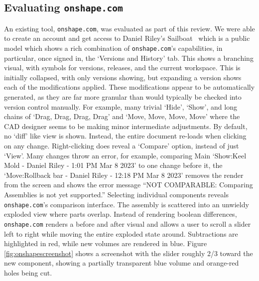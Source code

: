 \documentclass[sigconf,authorversion,nonacm]{acmart}
\begin{document}
\subsection{Evaluating \texttt{onshape.com}}

An existing tool, \texttt{onshape.com}, was evaluated as part of this review.
We were able to create an account and get access to Daniel Riley's Sailboat~\cite{sailboat}
which is a public model which shows a rich combination of \texttt{onshape.com}'s capabilities, in particular, once signed in, the `Versions and History' tab.
This shows a branching visual, with symbols for versions, releases, and the current workspace.
This is initially collapsed, with only versions showing, but expanding a version shows each of the modifications applied.
These modifications appear to be automatically generated, as they are far more granular than would typically be checked into version control manually.
For example, many trivial `Hide', `Show', and long chains of `Drag, Drag, Drag, Drag' and `Move, Move, Move, Move' where the CAD designer seems to be making minor intermediate adjustments.
By default, no `diff' like view is shown.
Instead, the entire document re-loads when clicking on any change.
Right-clicking does reveal a `Compare' option, instead of just `View'.
Many changes throw an error, for example, comparing Main `Show:Keel Mold - Daniel Riley - 1:01 PM Mar 8 2023' to one change before it, the `Move:Rollback bar - Daniel Riley - 12:18 PM Mar 8 2023' removes the render from the screen and shows the error message ``NOT COMPARABLE: Comparing Assemblies is not yet supported.''
Selecting individual components reveals \texttt{onshape.com}'s comparison interface.
The assembly is scattered into an unwieldy exploded view where parts overlap.
Instead of rendering boolean differences, \texttt{onshape.com} renders a before and after visual and allows a user to scroll a slider left to right while moving the entire exploded state around.
Subtractions are highlighted in red, while new volumes are rendered in blue.
Figure \ref{fig:onshapescreenshot} shows a screenshot with the slider roughly 2/3 toward the new component, showing a partially transparent blue volume and orange-red holes being cut.
\end{document}

